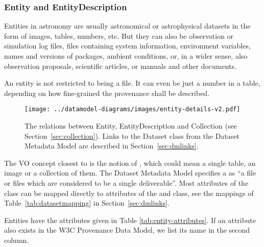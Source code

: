\subsubsection{Entity and EntityDescription}

Entities in astronomy are usually astronomical or astrophysical datasets in the 
form of images, tables, numbers, etc. But they can also be observation or 
simulation log files, files containing system information, environment
variables, names and versions of packages, ambient conditions, or, in a wider
sense, also observation proposals, scientific  articles, or manuals and other
documents. 

An entity is not restricted to being a file. 
It can even be just a number in a table, depending on how fine-grained the 
provenance shall be described.

\begin{figure}[h]
\centering
\texttt{[image: ../datamodel-diagrams/images/entity-details-v2.pdf]}
\caption[Relations between Entity, EntityDescription and Collection]{The relations between Entity, EntityDescription and Collection (see Section~\ref{sec:collection}). 
Links to the Dataset class from the Dataset Metadata Model are described in Section~\ref{sec:dmlinks}.}
\label{fig:entity-details}
\end{figure}

The VO concept closest to  is the notion of , which
could mean a single  table, an image or a collection of them. The Dataset
Metadata Model  \citep{std:DatasetDM} specifies a  as ``a file or
files which  are considered to be a single deliverable''.  Most attributes of
the  class can be mapped directly to attributes of the
 and  class, see the mappings of 
Table~\ref{tab:datasetmapping} in Section~\ref{sec:dmlinks}.


Entities have the attributes given in Table 
\ref{tab:entity-attributes}. If an attribute also exists in the W3C 
Provenance Data Model, we list its name in the second column.



